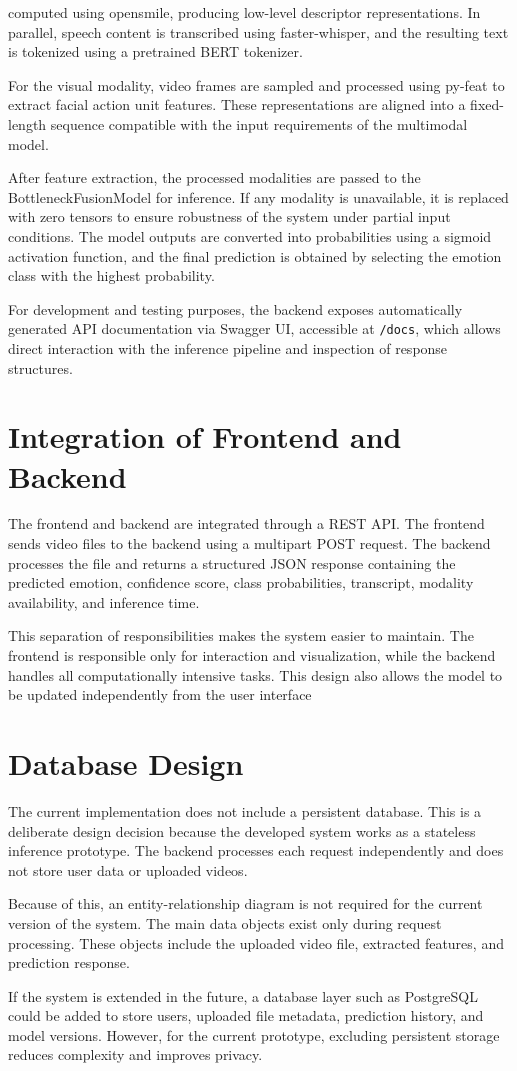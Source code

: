 computed using opensmile, producing low-level descriptor representations. In parallel, speech content is transcribed using faster-whisper, and the resulting text is tokenized using a pretrained BERT tokenizer.

For the visual modality, video frames are sampled and processed using py-feat to extract facial action unit features. These representations are aligned into a fixed-length sequence compatible with the input requirements of the multimodal model.

After feature extraction, the processed modalities are passed to the BottleneckFusionModel for inference. If any modality is unavailable, it is replaced with zero tensors to ensure robustness of the system under partial input conditions. The model outputs are converted into probabilities using a sigmoid activation function, and the final prediction is obtained by selecting the emotion class with the highest probability.

For development and testing purposes, the backend exposes automatically generated API documentation via Swagger UI, accessible at \texttt{/docs}, which allows direct interaction with the inference pipeline and inspection of response structures.


\section{Integration of Frontend and Backend}

The frontend and backend are integrated through a REST API. The frontend sends video files to the backend using a multipart POST request. The backend processes the file and returns a structured JSON response containing the predicted emotion, confidence score, class probabilities, transcript, modality availability, and inference time.

This separation of responsibilities makes the system easier to maintain. The frontend is responsible only for interaction and visualization, while the backend handles all computationally intensive tasks. This design also allows the model to be updated independently from the user interface


\section{Database Design}

The current implementation does not include a persistent database. This is a deliberate design decision because the developed system works as a stateless inference prototype. The backend processes each request independently and does not store user data or uploaded videos.

Because of this, an entity-relationship diagram is not required for the current version of the system. The main data objects exist only during request processing. These objects include the uploaded video file, extracted features, and prediction response.

If the system is extended in the future, a database layer such as PostgreSQL could be added to store users, uploaded file metadata, prediction history, and model versions. However, for the current prototype, excluding persistent storage reduces complexity and improves privacy.